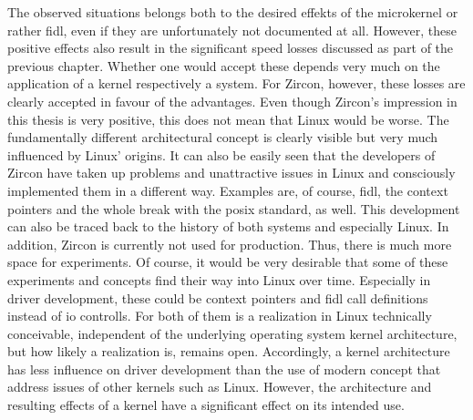 The observed situations belongs both to the desired effekts of the microkernel or rather \ac{fidl}, even if they are unfortunately not documented at all.
However, these positive effects also result in the significant speed losses discussed as part of the previous chapter.
Whether one would accept these depends very much on the application of a kernel respectively a system.
For Zircon, however, these losses are clearly accepted in favour of the advantages.
Even though Zircon's impression in this thesis is very positive, this does not mean that Linux would be worse.
The fundamentally different architectural concept is clearly visible but very much influenced by Linux' origins.
It can also be easily seen that the developers of Zircon have taken up problems and unattractive issues in Linux and consciously implemented them in a different way.
Examples are, of course, \ac{fidl}, the context pointers and the whole break with the \ac{posix} standard, as well.
This development can also be traced back to the history of both systems and especially Linux.
In addition, Zircon is currently not used for production.
Thus, there is much more space for experiments.
Of course, it would be very desirable that some of these experiments and concepts find their way into Linux over time.
Especially in driver development, these could be context pointers and \ac{fidl} call definitions instead of \ac{io} controlls.
For both of them is a realization in Linux technically conceivable, independent of the underlying operating system kernel architecture, but how likely a realization is, remains open.
Accordingly, a kernel architecture has less influence on driver development than the use of modern concept that address issues of other kernels such as Linux.
However, the architecture and resulting effects of a kernel have a significant effect on its intended use.





